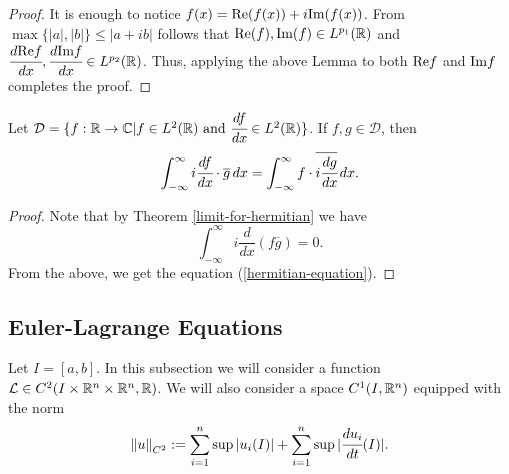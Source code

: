 \documentclass[main.tex]{subfiles}
\begin{document}
\begin{proof}
It is enough to notice $f(x) = \text{Re}(f(x)) + i\text{Im}(f(x))$. From $\max\{|a|,|b|\} \leq |a + ib|$ follows that $\text{Re}(f),\text{Im}(f)\in L^{p_1}(\mathbb{R})$ and $\cfrac{d\text{Re} f}{dx},\cfrac{d\text{Im} f}{dx}\in L^{p_2}(\mathbb{R})$. Thus, applying the above Lemma to both $\text{Re} f$ and $\text{Im} f$ completes the proof.
\end{proof}
\begin{theorem}
Let $\mathcal{D} = \{f:\mathbb{R}\to\mathbb{C} \vert f\in L^2(\mathbb{R}) \text{ and } \cfrac{df}{dx}\in L^{2}(\mathbb{R})\}$. If $f,g\in \mathcal{D}$, then
\begin{equation}
\label{hermitian-equation}
\int_{-\infty}^{\infty} i\cfrac{df}{dx}\cdot \overline{g}\, dx = \int_{-\infty}^{\infty} f \cdot \overline{i\cfrac{dg}{dx}}\, dx.
\end{equation}
\begin{proof}
Note that by Theorem \ref{limit-for-hermitian} we have
\begin{equation}
    \int_{-\infty}^{\infty} i\frac{d}{dx}(f\overline{g}) = 0.
\end{equation}
From the above, we get the equation (\ref{hermitian-equation}).
\end{proof}
\end{theorem}

\subsection{Euler-Lagrange Equations}
Let $I = [a, b]$. In this subsection we will consider a function $\mathcal{L}\in C^2(I\times \mathbb{R}^n \times\mathbb{R}^n, \mathbb{R})$. We will also consider a space $C^1(I, \mathbb{R}^n)$ equipped with the norm
\begin{equation}
\norm{u}_{C^2} := \sum_{i=1}^n \sup|u_i(I)| + \sum_{i=1}^n \sup|\cfrac{d u_i}{dt}(I)|.
\end{equation}
\end{document}
